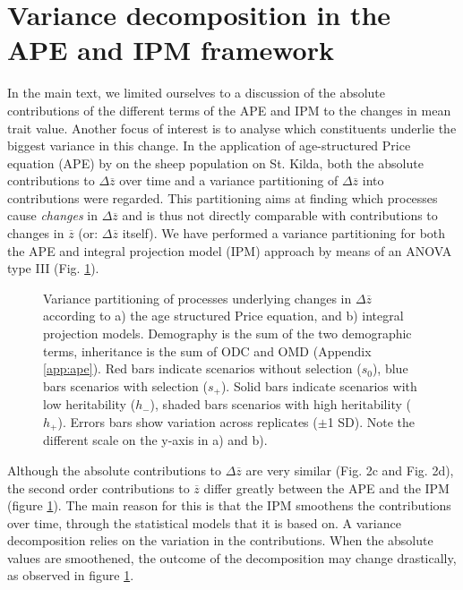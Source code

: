\section{Variance decomposition in the APE and IPM framework}
\label{app:var}
In the main text, we limited ourselves to a discussion of the absolute contributions of the different terms of the APE and IPM to the changes in mean trait value. Another focus of interest is to analyse which constituents underlie the biggest variance in this change. In the application of age-structured Price equation (APE) by \citet{Ozgul2009} on the sheep population on St. Kilda, both the absolute contributions to $\Delta \overline z$ over time and a variance partitioning of $\Delta \overline z$ into contributions were regarded. This partitioning aims at finding which processes cause \textit{changes} in $\Delta \overline z$ and is thus not directly comparable with contributions to changes in $\overline z$ (or: $\Delta \overline z$ itself). We have performed a variance partitioning for both the APE and integral projection model (IPM) approach by means of an ANOVA type III (Fig. \ref{app:var:fig1}).

\begin{figure}[H]
\caption{Variance partitioning of processes underlying changes in $\Delta \overline z$ according to a) the age structured Price equation, and b) integral projection models. Demography is the sum of the two demographic terms, inheritance is the sum of ODC and OMD (Appendix \ref{app:ape}). Red bars indicate scenarios without selection ($s_0$), blue bars scenarios with selection ($s_+$). Solid bars indicate scenarios with low heritability ($h_-$), shaded bars scenarios with high heritability ($h_+$). Errors bars show variation across replicates ($\pm$1 SD). Note the different scale on the y-axis in a) and b).}
\label{app:var:fig1}
\end{figure}

Although the absolute contributions to $\Delta \overline z$ are very similar (Fig. 2c and Fig. 2d), the second order contributions to $\overline z$ differ greatly between the APE and the IPM (figure \ref{app:var:fig1}). The main reason for this is that the IPM smoothens the contributions over time, through the statistical models that it is based on. A variance decomposition relies on the variation in the contributions. When the absolute values are smoothened, the outcome of the decomposition may change drastically, as observed in figure \ref{app:var:fig1}.

